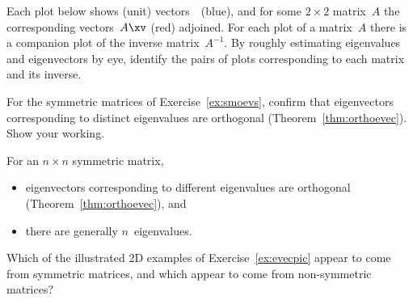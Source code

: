 \begin{exercise} \label{ex:} 
Each plot below shows (unit) vectors~\xv\ (blue), and for some \(2\times 2\) matrix~\(A\) the corresponding vectors~\(A\xv\) (red) adjoined. 
For each plot of a matrix~\(A\) there is a companion plot of the inverse matrix~\(A^{-1}\).
By roughly estimating eigenvalues and eigenvectors by eye, identify the pairs of plots corresponding to each matrix and its inverse.
\begin{parts}
\item {}
\item {}
\item {}
\item {}
\item {}
\item {}
\item {}
\item {}
\item {}
\item {}
\end{parts}
\end{exercise}





\begin{exercise} \label{ex:} 
For the symmetric matrices of Exercise~\ref{ex:smoevs}, confirm that eigenvectors corresponding to distinct eigenvalues are orthogonal (Theorem~\ref{thm:orthoevec}).  Show your working.
\end{exercise}






\begin{exercise} \label{ex:} 
For an \(n\times n\) symmetric matrix,
\begin{itemize}
\item  eigenvectors corresponding to different eigenvalues are orthogonal (Theorem~\ref{thm:orthoevec}), and
\item  there are generally \(n\)~eigenvalues.
\end{itemize}
Which of the illustrated 2D examples of Exercise~\ref{ex:evecpic} appear to come from symmetric matrices, and which appear to come from non-symmetric matrices?
\end{exercise}





